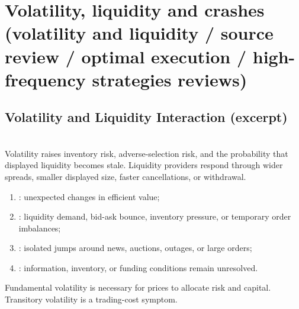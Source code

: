 \documentclass[a4paper,oneside,openany]{book}
\begin{document}
\section*{Volatility, liquidity and crashes (volatility and liquidity / source review / optimal execution / high-frequency strategies reviews)}

\subsection*{Volatility and Liquidity Interaction (excerpt)}

\begin{principle} \\
Volatility raises inventory risk, adverse-selection risk, and the probability that displayed liquidity becomes stale. Liquidity providers respond through wider spreads, smaller displayed size, faster cancellations, or withdrawal.
\end{principle}

\begin{taxonomy} 
\begin{enumerate}[label=\roman*.]
\setlength{\itemsep}{0pt}
\item {}: unexpected changes in efficient value;
\item {}: liquidity demand, bid-ask bounce, inventory pressure, or temporary order imbalances;
\item {}: isolated jumps around news, auctions, outages, or large orders;
\item {}: information, inventory, or funding conditions remain unresolved.
\end{enumerate}
Fundamental volatility is necessary for prices to allocate risk and capital.\\
Transitory volatility is a trading-cost symptom.
\end{taxonomy}
\end{document}

